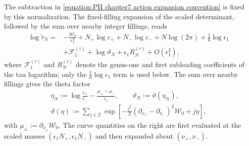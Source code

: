 \documentclass[a4paper,11pt]{article}
\numberwithin{equation}{section}
\begin{document}
The subtraction in
\eqref{equation:PII chapter7 action expansion convention} is fixed
by this normalization.  The fixed-filling expansion of the scaled
determinant, followed by the sum over nearby integer fillings,
reads
\begin{equation}
\label{equation:PII normalization expansion}
\begin{aligned}
\log{\widetilde{\tau}_{N}}
={}&-\frac{\mathcal{W}_{0}}{\epsilon_{1}^{2}}
+N_{+}\log{c_{+}}+N_{-}\log{c_{-}}
+N\log{(2\pi)}+\frac{1}{6}\log{\epsilon_{1}}\\
&+\mathcal{F}_{1}^{(\tau)}+\log{\vartheta_{N}}
+\epsilon_{1}R_{N}^{(\tau)}+O\left(\epsilon_{1}^{2}\right),
\end{aligned}
\end{equation}
where $\mathcal{F}_{1}^{(\tau)}$ and $R_{N}^{(\tau)}$ denote the
genus-one and first subleading coefficients of the tau logarithm;
only the $\frac{1}{6}\log{\epsilon_{1}}$ term is used below.
The sum over nearby fillings gives the theta factor
\cite{BorotGuionnet2013}
\begin{equation}
\label{equation:PII normalization theta}
\begin{gathered}
\eta_{N}:=\log{\frac{c_{+}}{c_{-}}}
-\frac{\mu_{+}-\mu_{-}}{\epsilon_{1}},
\qquad
\vartheta_{N}:=\vartheta(\eta_{N}),\\
\vartheta(\eta):=\sum_{j\in\mathbb{Z}}
\exp\left[-\frac{j^{2}}{2}
\left(\partial_{\nu_{+}}-\partial_{\nu_{-}}\right)^{2}\mathcal{W}_{0}
+j\eta\right],
\end{gathered}
\end{equation}
with $\mu_{\pm}:=\partial_{\nu_{\pm}}\mathcal{W}_{0}$.  The curve
quantities on the right are first evaluated at the scaled masses
$(\epsilon_{1}N_{+},\epsilon_{1}N_{-})$ and then expanded about
$(\nu_{+},\nu_{-})$.
\end{document}
